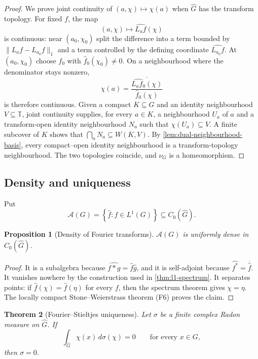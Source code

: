 \documentclass[11pt]{article}
\newtheorem{theorem}{Theorem}[section]
\newtheorem{proposition}[theorem]{Proposition}
\theoremstyle{definition}
\theoremstyle{remark}
\newcommand{\T}{\mathbb T}
\newcommand{\Czero}{C_0}
\newcommand{\Lp}[1]{L^{#1}}
\newcommand{\dual}[1]{\widehat{#1}}
\newcommand{\norm}[1]{\lVert #1\rVert}
\newcommand{\set}[1]{\left\{#1\right\}}
\begin{document}
\begin{proof}
We prove joint continuity of $(a,\chi)\mapsto\chi(a)$ when $\dual G$ has the transform
topology.  For fixed $f$, the map
\[
  (a,\chi)\longmapsto\widehat{L_af}(\chi)
\]
is continuous: near $(a_0,\chi_0)$ split the difference into a term bounded by
$\norm{L_af-L_{a_0}f}_1$ and a term controlled by the defining coordinate
$\widehat{L_{a_0}f}$.  At $(a_0,\chi_0)$ choose $f_0$ with
$\widehat f_0(\chi_0)\neq0$.  On a neighbourhood where the denominator stays nonzero,
\[
 \chi(a)=\overline{
   \frac{\widehat{L_af_0}(\chi)}{\widehat f_0(\chi)}}
\]
is therefore continuous.  Given a compact $K\subseteq G$ and an identity neighbourhood
$V\subseteq\T$, joint continuity supplies, for every $a\in K$, a neighbourhood $U_a$ of
$a$ and a transform-open identity neighbourhood $N_a$ such that
$\chi(U_a)\subseteq V$.  A finite subcover of $K$ shows that
$\bigcap_aN_a\subseteq W(K,V)$.  By
\cref{lem:dual-neighbourhood-basis}, every compact--open identity neighbourhood is a
transform-topology neighbourhood.  The two topologies coincide, and $\nu_G$ is a
homeomorphism.
\end{proof}

\subsection{Density and uniqueness}

Put
\[
  \mathcal A(G)=\set{\widehat f:f\in\Lp1(G)}\subseteq\Czero(\dual G).
\]

\begin{proposition}[Density of Fourier transforms]
\label{prop:fourier-dense}
$\mathcal A(G)$ is uniformly dense in $\Czero(\dual G)$.
\end{proposition}

\begin{proof}
It is a subalgebra because $\widehat{f*g}=\widehat f\widehat g$, and it is self-adjoint
because $\widehat{f^*}=\overline{\widehat f}$.  It vanishes nowhere by the construction
used in \cref{thm:l1-spectrum}.  It separates points: if
$\widehat f(\chi)=\widehat f(\eta)$ for every $f$, then the spectrum theorem gives
$\chi=\eta$.  The locally compact Stone--Weierstrass theorem (F6) proves the claim.
\end{proof}

\begin{theorem}[Fourier--Stieltjes uniqueness]
\label{thm:FS-uniqueness}
Let $\sigma$ be a finite complex Radon measure on $\dual G$.  If
\[
  \int_{\dual G}\chi(x)\,d\sigma(\chi)=0
  \qquad\text{for every }x\in G,
\]
then $\sigma=0$.
\end{theorem}
\end{document}
